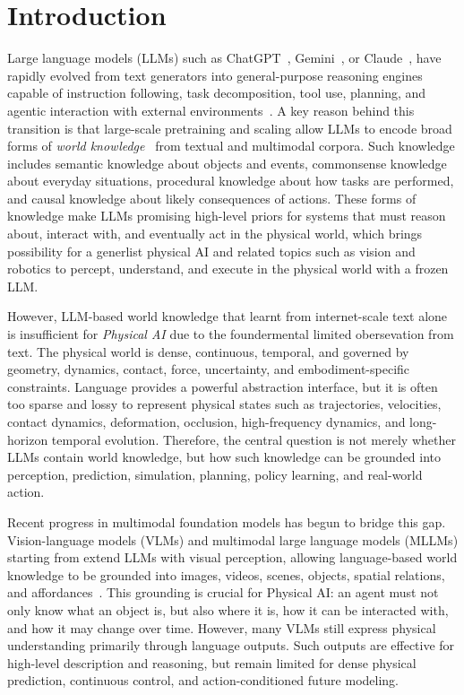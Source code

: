 \section{Introduction}

Large language models (LLMs) such as ChatGPT~\cite{openai2023gpt4}, Gemini~\cite{team2023gemini}, or Claude~\cite{anthropic2024claude35sonnettool}, have rapidly evolved from text generators into general-purpose reasoning engines capable of instruction following, task decomposition, tool use, planning, and agentic interaction with external environments~\citep{brown2020language,wei2022chain}. 
A key reason behind this transition is that large-scale pretraining and scaling allow LLMs to encode broad forms of \emph{world knowledge}~\cite{hagoort2004integration, arkin1990integrating, schwenk2022okvqa} from textual and multimodal corpora. 
Such knowledge includes semantic knowledge about objects and events, commonsense knowledge about everyday situations, procedural knowledge about how tasks are performed, and causal knowledge about likely consequences of actions. 
These forms of knowledge make LLMs promising high-level priors for systems that must reason about, interact with, and eventually act in the physical world, which brings possibility for a generlist physical AI and related topics such as vision and robotics to percept, understand, and execute in the physical world with a frozen LLM.

However, LLM-based world knowledge that learnt from internet-scale text alone is insufficient for \emph{Physical AI} due to the foundermental limited obersevation from text. 
The physical world is dense, continuous, temporal, and governed by geometry, dynamics, contact, force, uncertainty, and embodiment-specific constraints. 
Language provides a powerful abstraction interface, but it is often too sparse and lossy to represent physical states such as trajectories, velocities, contact dynamics, deformation, occlusion, high-frequency dynamics, and long-horizon temporal evolution. 
Therefore, the central question is not merely whether LLMs contain world knowledge, but how such knowledge can be grounded into perception, prediction, simulation, planning, policy learning, and real-world action.

Recent progress in multimodal foundation models has begun to bridge this gap. 
Vision-language models (VLMs) and multimodal large language models (MLLMs) starting from 
extend LLMs with visual perception, allowing language-based world knowledge to be grounded into images, videos, scenes, objects, spatial relations, and affordances~\citep{alayrac2022flamingo,liu2023llava,openai2023gpt4v}. 
This grounding is crucial for Physical AI: an agent must not only know what an object is, but also where it is, how it can be interacted with, and how it may change over time. 
However, many VLMs still express physical understanding primarily through language outputs. 
Such outputs are effective for high-level description and reasoning, but remain limited for dense physical prediction, continuous control, and action-conditioned future modeling.



